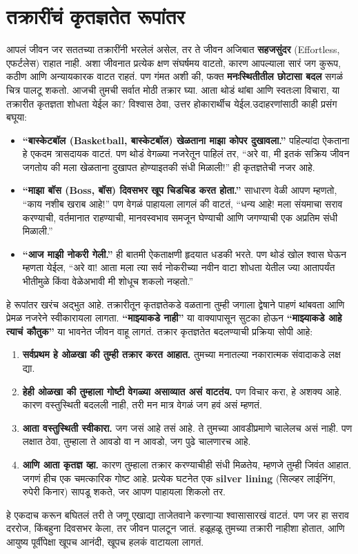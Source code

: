  \chapter{तक्रारींचं कृतज्ञतेत रूपांतर}
आपलं जीवन जर सततच्या तक्रारींनी भरलेलं असेल, तर ते जीवन अजिबात \textbf{सहजसुंदर} (Effortless,  एफर्टलेस) राहात नाही. अशा जीवनात प्रत्येक क्षण संघर्षमय वाटतो, कारण आपल्याला सारं जग कुरूप, कठीण आणि अन्यायकारक वाटत राहतं. पण गंमत अशी की, फक्त \textbf{मनःस्थितीतील छोटासा बदल} सगळं चित्र पालटू शकतो.
आजची तुमची सर्वात मोठी तक्रार घ्या. आता थोडं थांबा आणि स्वतःला विचारा,  या तक्रारीत कृतज्ञता शोधता येईल का? विश्वास ठेवा, उत्तर होकारार्थीच येईल.उदाहरणांसाठी काही प्रसंग बघूया:
\begin{itemize}
 \item \textbf{“बास्केटबॉल (Basketball,  बास्केटबॉल) खेळताना माझा कोपर दुखावला.”} पहिल्यांदा ऐकताना हे एकदम त्रासदायक वाटतं. पण थोडं वेगळ्या नजरेतून पाहिलं तर,  “अरे वा, मी इतकं सक्रिय जीवन जगतोय की मला खेळताना दुखापत होण्याइतकी संधी मिळाली!” ही कृतज्ञतेची नजर आहे.
\item \textbf{“माझा बॉस (Boss,  बॉस) दिवसभर खूप चिडचिड करत होता.”} साधारण वेळी आपण म्हणतो, 
 “काय नशीब खराब आहे!” पण वेगळं पाहायला लागलं की वाटतं,  “धन्य आहे! मला संयमाचा सराव करण्याची,
 वर्तमानात राहण्याची, मानवस्वभाव समजून घेण्याची आणि जगण्याची एक अप्रतिम संधी मिळाली.”
\item \textbf{“आज माझी नोकरी गेली.”} ही बातमी ऐकताक्षणी हृदयात धडकी भरते. पण थोडं खोल श्वास घेऊन म्हणता येईल,  “अरे वा! आता मला त्या सर्व नोकरीच्या नवीन वाटा शोधता येतील ज्या आतापर्यंत भीतीमुळे किंवा वेळेअभावी मी शोधूच शकलो नव्हतो.”
 \end{itemize}
हे रूपांतर खरंच अद्भुत आहे. तक्रारीतून कृतज्ञतेकडे वळताना तुम्ही जगाला द्वेषाने पाहणं थांबवता आणि प्रेमळ नजरेने स्वीकारायला लागता. \textbf{“माझ्याकडे नाही”} या वाक्यापासून सुटका होऊन \textbf{“माझ्याकडे आहे त्याचं कौतुक”} या भावनेत जीवन वाहू लागतं.
तक्रार कृतज्ञतेत बदलण्याची प्रक्रिया सोपी आहे:
\begin{enumerate}
 \item \textbf{सर्वप्रथम हे ओळखा की तुम्ही तक्रार करत आहात.}
 तुमच्या मनातल्या नकारात्मक संवादाकडे लक्ष द्या.
\item \textbf{हेही ओळखा की तुम्हाला गोष्टी वेगळ्या असाव्यात असं वाटतंय.} पण विचार करा, हे अशक्य आहे.
 कारण वस्तुस्थिती बदलली नाही, तरी मन मात्र वेगळं जग हवं असं म्हणतं.
\item \textbf{आता वस्तुस्थिती स्वीकारा.} जग जसं आहे तसं आहे. ते तुमच्या आवडीप्रमाणे चालेलच असं नाही.
 पण लक्षात ठेवा, तुम्हाला ते आवडो वा न आवडो, जग पुढे चालणारच आहे.
\item \textbf{आणि आता कृतज्ञ व्हा.} कारण तुम्हाला तक्रार करण्याचीही संधी मिळतेय, म्हणजे तुम्ही जिवंत आहात. जगणं हीच एक चमत्कारिक गोष्ट आहे. प्रत्येक घटनेत एक \textbf{silver lining} (सिल्व्हर लाईनिंग,  रुपेरी किनार) सापडू शकते, जर आपण पाहायला शिकलो तर.
 \end{enumerate}
हे एकदाच करून बघितलं तरी ते जणू एखाद्या ताजेतवाने करणाऱ्या श्वासासारखं वाटतं. पण जर हा सराव दररोज,
 किंबहुना दिवसभर केला, तर जीवन पालटून जातं. हळूहळू तुमच्या तक्रारी नाहीशा होतात, आणि आयुष्य पूर्वीपेक्षा
 खूपच आनंदी, खूपच हलकं वाटायला लागतं.
